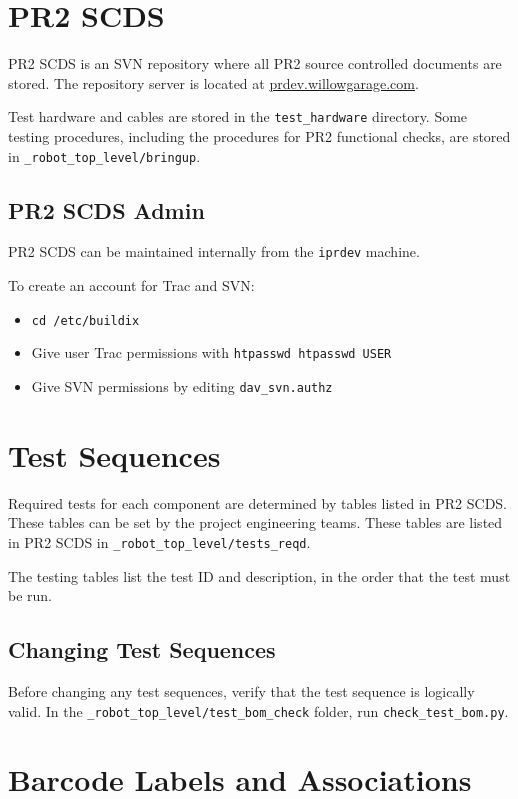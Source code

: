 \documentclass[11pt]{book}
\begin{document}
\section{PR2 SCDS}

PR2 SCDS is an SVN repository where all PR2 source controlled documents are stored. The repository server is located at \href{http://prdev.willowgarage.com}{prdev.willowgarage.com}.

Test hardware and cables are stored in the \texttt{test\_hardware} directory. Some testing procedures, including the procedures for PR2 functional checks, are stored in \texttt{\_robot\_top\_level/bringup}.

\subsection{PR2 SCDS Admin}

PR2 SCDS can be maintained internally from the \texttt{iprdev} machine. 

To create an account for Trac and SVN:
\begin{itemize}
\item \texttt{cd /etc/buildix}
\item Give user Trac permissions with \texttt{htpasswd htpasswd USER}
\item Give SVN permissions by editing \texttt{dav\_svn.authz}
\end{itemize}

\section{Test Sequences}

Required tests for each component are determined by tables listed in PR2 SCDS. These tables can be set by the project engineering teams. These tables are listed in PR2 SCDS in \texttt{\_robot\_top\_level/tests\_reqd}. 

The testing tables list the test ID and description, in the order that the test must be run.

\subsection{Changing Test Sequences}

Before changing any test sequences, verify that the test sequence is logically valid. In the \texttt{\_robot\_top\_level/test\_bom\_check} folder, run \texttt{check\_test\_bom.py}. 

\section{Barcode Labels and Associations}
\end{document}
